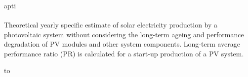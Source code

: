 apti     \documentclass[10pt,a4paper,UTF8]{article}
\begin{document}
{\paragraph{} Theoretical yearly specific estimate of solar electricity production by a photovoltaic system without considering the long-term ageing and performance degradation of PV modules and other system components. Long-term average performance ratio (PR) is calculated for a start-up production of a PV system.%


%


 {\footnotesize 

     \begin{longtabu} to \textwidth{ X[5,L]X[1.5,R]X[1,R]X[1.5,R]X[1,R]X[1,R]X[1,R]X[1,R] }
    
    
    \caption{ Energy conversion and related losses }
    

     \hline 

    
    

\end{longtabu}}}
\end{document}
